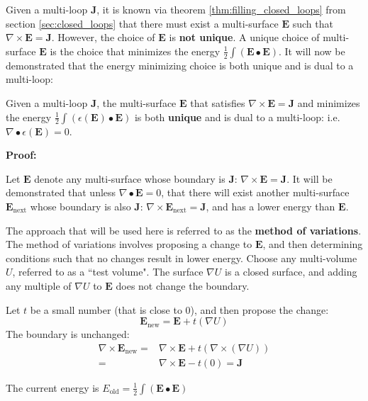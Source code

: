 Given a multi-loop \(\mathbf{J}\), it is known via theorem \ref{thm:filling_closed_loops} from section \ref{sec:closed_loops} that there must exist a multi-surface \(\mathbf{E}\) such that \(\nabla \times \mathbf{E} = \mathbf{J}\). However, the choice of \(\mathbf{E}\) is {\bf not unique}. A unique choice of multi-surface \(\mathbf{E}\) is the choice that minimizes the energy \(\frac{1}{2}\int (\mathbf{E} \bullet \mathbf{E})\). It will now be demonstrated that the energy minimizing choice is both unique and is dual to a multi-loop:

\begin{thm}\label{thm:low_energy_surface}
Given a multi-loop \(\mathbf{J}\), the multi-surface \(\mathbf{E}\) that satisfies \(\nabla \times \mathbf{E} = \mathbf{J}\) and minimizes the energy \(\frac{1}{2}\int (\epsilon(\mathbf{E}) \bullet \mathbf{E})\) is both {\bf unique} and is dual to a multi-loop: i.e. \(\nabla \bullet \epsilon(\mathbf{E}) = 0\). 
\end{thm}
\textbf{Proof:}

Let \(\mathbf{E}\) denote any multi-surface whose boundary is \(\mathbf{J}\): \(\nabla \times \mathbf{E} = \mathbf{J}\). It will be demonstrated that unless \(\nabla \bullet \mathbf{E} = 0\), that there will exist another multi-surface \(\mathbf{E}_{\text{next}}\) whose boundary is also \(\mathbf{J}\): \(\nabla \times \mathbf{E}_{\text{next}} = \mathbf{J}\), and has a lower energy than \(\mathbf{E}\). 

The approach that will be used here is referred to as the {\bf method of variations}. The method of variations involves proposing a change to \(\mathbf{E}\), and then determining conditions such that no changes result in lower energy. Choose any multi-volume \(U\), referred to as a ``test volume". The surface \(\nabla U\) is a closed surface, and adding any multiple of \(\nabla U\) to \(\mathbf{E}\) does not change the boundary.

Let \(t\) be a small number (that is close to 0), and then propose the change:
\[\mathbf{E}_{\text{new}} = \mathbf{E} + t(\nabla U)\]
The boundary is unchanged:
\begin{align*}
\nabla \times \mathbf{E}_{\text{new}} = & \nabla \times \mathbf{E} + t(\nabla \times (\nabla U)) \\ 
= & \nabla \times \mathbf{E} - t(0) 
= \mathbf{J}
\end{align*}

The current energy is \(E_{\text{old}} = \frac{1}{2}\int (\mathbf{E} \bullet \mathbf{E})\)

